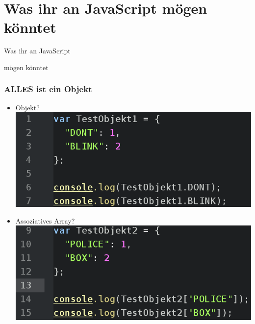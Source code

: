 \documentclass{beamer}
\begin{document}

\section{Was ihr an JavaScript mögen könntet} %

\begin{frame}
\Huge{
\centerline{Was ihr an JavaScript}
\centerline{mögen könntet}
}
\end{frame}


\begin{frame}
\frametitle{ALLES ist ein Objekt}
\begin{itemize}
\item Objekt?
\\
\includegraphics[scale=0.3]{assets/everyobject_object.png}
\item Assoziatives Array?
\includegraphics[scale=0.3]{assets/everyobject_asarray.png}
\end{itemize}
\end{frame}

\end{document}
